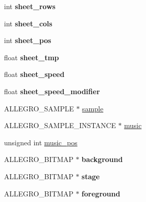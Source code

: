 \begin{DoxyCompactItemize}
\item 
\hypertarget{structLevel_a6d608b79c9b4dd8a5efc0c7e5fb482b0}{int {\bfseries sheet\-\_\-rows}}\label{structLevel_a6d608b79c9b4dd8a5efc0c7e5fb482b0}

\item 
\hypertarget{structLevel_a8a5c443169a4ff15f330a65473eedb1b}{int {\bfseries sheet\-\_\-cols}}\label{structLevel_a8a5c443169a4ff15f330a65473eedb1b}

\item 
\hypertarget{structLevel_a21c699af201ffe60ccd1319b3f540947}{int {\bfseries sheet\-\_\-pos}}\label{structLevel_a21c699af201ffe60ccd1319b3f540947}

\item 
\hypertarget{structLevel_a22e80ea91fd267dae85c0457e581d072}{float {\bfseries sheet\-\_\-tmp}}\label{structLevel_a22e80ea91fd267dae85c0457e581d072}

\item 
\hypertarget{structLevel_a41db1345ac158898450907010a49748f}{float {\bfseries sheet\-\_\-speed}}\label{structLevel_a41db1345ac158898450907010a49748f}

\item 
\hypertarget{structLevel_a3cae10fd441bcc14b6a47dd5fedafa59}{float {\bfseries sheet\-\_\-speed\-\_\-modifier}}\label{structLevel_a3cae10fd441bcc14b6a47dd5fedafa59}

\item 
\-A\-L\-L\-E\-G\-R\-O\-\_\-\-S\-A\-M\-P\-L\-E $\ast$ \hyperlink{structLevel_a234fa7b9ec35dd360e4e3c48a944fc7d}{sample}
\item 
\-A\-L\-L\-E\-G\-R\-O\-\_\-\-S\-A\-M\-P\-L\-E\-\_\-\-I\-N\-S\-T\-A\-N\-C\-E $\ast$ \hyperlink{structLevel_a41c6aae8f508e078b02c291e1d6f8e67}{music}
\item 
unsigned int \hyperlink{structLevel_a13e322deb3298846260af31324e5b492}{music\-\_\-pos}
\item 
\hypertarget{structLevel_a4b4dd31284206502977b3d5b95d52abc}{\-A\-L\-L\-E\-G\-R\-O\-\_\-\-B\-I\-T\-M\-A\-P $\ast$ {\bfseries background}}\label{structLevel_a4b4dd31284206502977b3d5b95d52abc}

\item 
\hypertarget{structLevel_a70b6ea7746ac88775b4197349ec312d1}{\-A\-L\-L\-E\-G\-R\-O\-\_\-\-B\-I\-T\-M\-A\-P $\ast$ {\bfseries stage}}\label{structLevel_a70b6ea7746ac88775b4197349ec312d1}

\item 
\hypertarget{structLevel_aa2b1c77ee0c36e44efb3a908cf4967dc}{\-A\-L\-L\-E\-G\-R\-O\-\_\-\-B\-I\-T\-M\-A\-P $\ast$ {\bfseries foreground}}\label{structLevel_aa2b1c77ee0c36e44efb3a908cf4967dc}


\end{DoxyCompactItemize}
